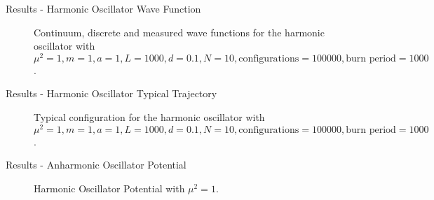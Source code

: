 \documentclass{beamer}
\begin{document}
\begin{frame}{Results - Harmonic Oscillator Wave Function}
    \begin{figure}
    \centering
        \caption{Continuum, discrete and measured wave functions for the harmonic oscillator with $\mu^2 = 1, m = 1, a = 1, L = 1000, d = 0.1, N = 10, \text{configurations} = 100000, \text{burn period} = 1000$.}
    \end{figure}
\end{frame}

\begin{frame}{Results - Harmonic Oscillator Typical Trajectory}
    \begin{figure}
    \centering
        \caption{Typical configuration for the harmonic oscillator with $\mu^2 = 1, m = 1, a = 1, L = 1000, d = 0.1, N = 10, \text{configurations} = 100000, \text{burn period} = 1000$.}
    \end{figure}
\end{frame}

\begin{frame}{Results - Anharmonic Oscillator Potential}
    \begin{figure}
    \centering
        \caption{Harmonic Oscillator Potential with $\mu^2 = 1$.}
    \end{figure}
\end{frame}
\end{document}
